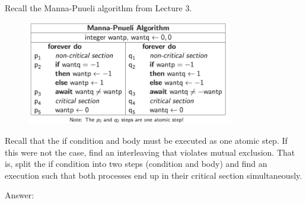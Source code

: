 \documentclass{article}
\begin{document}
\begin{Question} 
Recall the Manna-Pnueli algorithm from Lecture 3.
\begin{figure}[H]
    \centering 
    \includegraphics[width=0.8\textwidth]{DV_demand1}
\end{figure}
Recall that the if condition and body must be executed as one atomic step. If this were not the case, find an interleaving that violates mutual exclusion. That is, split the if condition into two steps (condition and body) and find an execution such that both processes end up in their critical section simultaneously.\\

\begin{answer}
Answer: \\
\begin{quote}
    
\end{quote}
\end{answer}
\end{Question}
\end{document}
